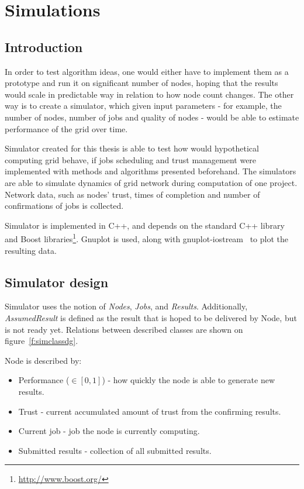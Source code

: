 \chapter{Simulations}
\label{ch:simulations}

\section{Introduction}

In order to test algorithm ideas, one would either have to implement them as a prototype and run it on significant number of nodes, hoping that the results would scale in predictable way in relation to how node count changes. The other way is to create a simulator, which given input parameters - for example, the number of nodes, number of jobs and quality of nodes - would be able to estimate performance of the grid over time.

Simulator created for this thesis is able to test how would hypothetical computing grid behave, if jobs scheduling and trust management were implemented with methods and algorithms presented beforehand. The simulators are able to simulate dynamics of grid network during computation of one project. Network data, such as nodes' trust, times of completion and number of confirmations of jobs is collected.

Simulator is implemented in C++, and depends on the standard C++ library and Boost libraries\footnote{\url{http://www.boost.org/}}. Gnuplot is used, along with gnuplot-iostream~\cite{gp-iostream} to plot the resulting data.

\section{Simulator design}
\label{s:simdesign}

Simulator uses the notion of \emph{Nodes}, \emph{Jobs}, and \emph{Results}. Additionally, \emph{AssumedResult} is defined as the result that is hoped to be delivered by Node, but is not ready yet. Relations between described classes are shown on figure~\ref{f:simclassdg}.

Node is described by:
\begin{itemize}
\item Performance ($\in [0,1]$) - how quickly the node is able to generate new results.
\item Trust - current accumulated amount of trust from the confirming results.
\item Current job - job the node is currently computing.
\item Submitted results - collection of all submitted results.
\end{itemize}


